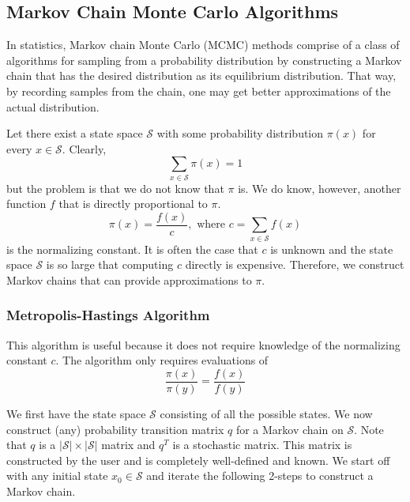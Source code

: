 \documentclass{article}
\begin{document}
  \subsection{Markov Chain Monte Carlo Algorithms}

    In statistics, Markov chain Monte Carlo (MCMC) methods comprise of a class of algorithms for sampling from a probability distribution by constructing a Markov chain that has the desired distribution as its equilibrium distribution. That way, by recording samples from the chain, one may get better approximations of the actual distribution. 

    Let there exist a state space $\mathcal{S}$ with some probability distribution $\pi(x)$ for every $x \in \mathcal{S}$. Clearly, 
    \begin{equation}
      \sum_{x \in \mathcal{S}} \pi(x) = 1
    \end{equation}
    but the problem is that we do not know that $\pi$ is. We do know, however, another function $f$ that is directly proportional to $\pi$. 
    \begin{equation}
      \pi(x) = \frac{f(x)}{c}, \text{ where } c = \sum_{x \in \mathcal{S}} f(x)
    \end{equation}
    is the normalizing constant. It is often the case that $c$ is unknown and the state space $\mathcal{S}$ is so large that computing $c$ directly is expensive. Therefore, we construct Markov chains that can provide approximations to $\pi$. 

    \subsubsection{Metropolis-Hastings Algorithm}

      This algorithm is useful because it does not require knowledge of the normalizing constant $c$. The algorithm only requires evaluations of 
      \begin{equation}
        \frac{\pi(x)}{\pi(y)} = \frac{f(x)}{f(y)}
      \end{equation}

      We first have the state space $\mathcal{S}$ consisting of all the possible states. We now construct (any) probability transition matrix $q$ for a Markov chain on $\mathcal{S}$. Note that $q$ is a $|\mathcal{S}| \times |\mathcal{S}|$ matrix and $q^T$ is a stochastic matrix. This matrix is constructed by the user and is completely well-defined and known. We start off with any initial state $x_0 \in \mathcal{S}$ and iterate the following 2-steps to construct a Markov chain. 
\end{document}
